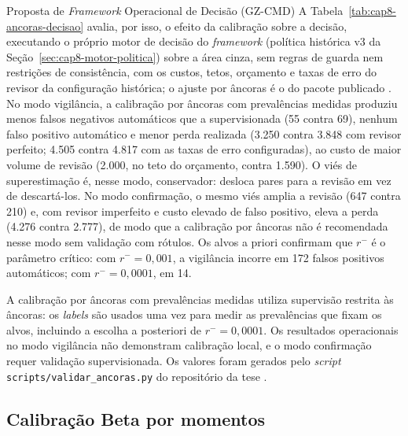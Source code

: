 \begin{chapter}{Proposta de \textit{Framework} Operacional de Decisão (GZ-CMD)}
A Tabela~\ref{tab:cap8-ancoras-decisao} avalia, por isso, o efeito da calibração sobre a decisão, executando o próprio motor de decisão do \textit{framework} (política histórica v3 da Seção~\ref{sec:cap8-motor-politica}) sobre a área cinza, sem regras de guarda nem restrições de consistência, com os custos, tetos, orçamento e taxas de erro do revisor da configuração histórica; o ajuste por âncoras é o do pacote publicado \cite{Jardim2026gzcmd}. No modo vigilância, a calibração por âncoras com prevalências medidas produziu menos falsos negativos automáticos que a supervisionada (55 contra 69), nenhum falso positivo automático e menor perda realizada (3.250 contra 3.848 com revisor perfeito; 4.505 contra 4.817 com as taxas de erro configuradas), ao custo de maior volume de revisão (2.000, no teto do orçamento, contra 1.590). O viés de superestimação é, nesse modo, conservador: desloca pares para a revisão em vez de descartá-los. No modo confirmação, o mesmo viés amplia a revisão (647 contra 210) e, com revisor imperfeito e custo elevado de falso positivo, eleva a perda (4.276 contra 2.777), de modo que a calibração por âncoras não é recomendada nesse modo sem validação com rótulos. Os alvos a priori confirmam que $r^-$ é o parâmetro crítico: com $r^- = 0{,}001$, a vigilância incorre em 172 falsos positivos automáticos; com $r^- = 0{,}0001$, em 14.



A calibração por âncoras com prevalências medidas utiliza supervisão restrita às âncoras: os \textit{labels} são usados uma vez para medir as prevalências que fixam os alvos, incluindo a escolha a posteriori de $r^- = 0{,}0001$. Os resultados operacionais no modo vigilância não demonstram calibração local, e o modo confirmação requer validação supervisionada. Os valores foram gerados pelo \textit{script} \texttt{scripts/validar\_ancoras.py} do repositório da tese \cite{Jardim2026phdrepo}.

\clearpage
\subsection{Calibração Beta por momentos}
\label{sec:cap8-calibracao-beta}


\end{chapter}
